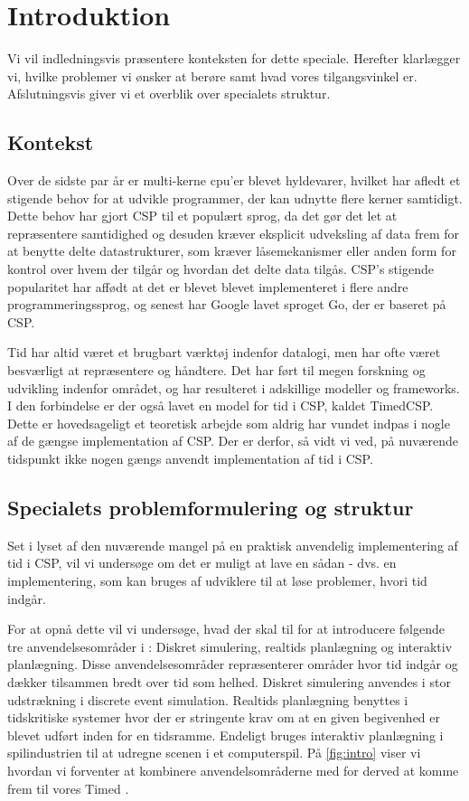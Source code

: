 \chapter{Introduktion}
Vi vil indledningsvis præsentere konteksten for dette speciale. Herefter klarlægger vi, hvilke problemer vi ønsker at berøre samt hvad vores tilgangsvinkel er. Afslutningsvis giver vi et overblik over specialets struktur. 

\section{Kontekst}
Over de sidste par år er multi-kerne cpu'er blevet hyldevarer, hvilket har afledt et stigende behov for at udvikle programmer, der kan udnytte flere kerner samtidigt. Dette behov har gjort CSP til et populært sprog, da det gør det let at repræsentere samtidighed og desuden kræver eksplicit udveksling af data frem for at benytte delte datastrukturer, som kræver låsemekanismer eller anden form for kontrol over hvem der tilgår og hvordan det delte data tilgås. CSP's stigende popularitet har affødt at det er blevet blevet implementeret i flere andre programmeringssprog, og senest har Google lavet sproget Go, der er baseret på CSP. 

Tid har altid været et brugbart værktøj indenfor datalogi, men har ofte været besværligt at repræsentere og håndtere. Det har ført til megen forskning og udvikling indenfor området, og har resulteret i adskillige modeller og frameworks. I den forbindelse er der også lavet en model for tid i CSP, kaldet TimedCSP. Dette er hovedsageligt et teoretisk arbejde som aldrig har vundet indpas i nogle af de gængse implementation af CSP. Der er derfor, så vidt vi ved, på nuværende tidspunkt ikke nogen gængs anvendt implementation af tid i CSP. 

\section{Specialets problemformulering og struktur}
Set i lyset af den nuværende mangel på en praktisk anvendelig implementering af tid i CSP, vil vi undersøge om det er muligt at lave en sådan - dvs. en implementering, som kan bruges af udviklere til at løse problemer, hvori tid indgår.

For at opnå dette vil vi undersøge, hvad der skal til for at introducere følgende tre anvendelsesområder i \pycsp: Diskret simulering, realtids planlægning og interaktiv planlægning. Disse anvendelsesområder repræsenterer områder hvor tid indgår  og dækker tilsammen bredt over tid som helhed. Diskret simulering anvendes i stor udstrækning i discrete event simulation. Realtids planlægning benyttes i tidskritiske systemer hvor der er stringente krav om at en given begivenhed er blevet udført inden for en tidsramme. Endeligt bruges interaktiv planlægning i spilindustrien til at udregne scenen i et computerspil. På \cref{fig:intro} viser vi hvordan vi forventer at kombinere anvendelsområderne med \pycsp for derved at komme frem til vores Timed \pycsp. 

